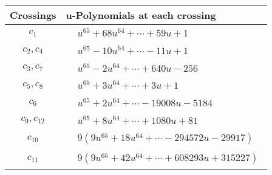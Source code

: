 \documentclass[1p]{elsarticle_modified}
\theoremstyle{definition}
\begin{document}
\begin{tabular}{m{50pt}|m{274pt}}
Crossings & \hspace{64pt}u-Polynomials at each crossing \\
\hline $$\begin{aligned}c_{1}\end{aligned}$$&$\begin{aligned}
&u^{65}+68 u^{64}+\cdots+59 u+1
\end{aligned}$\\
\hline $$\begin{aligned}c_{2},c_{4}\end{aligned}$$&$\begin{aligned}
&u^{65}-10 u^{64}+\cdots-11 u+1
\end{aligned}$\\
\hline $$\begin{aligned}c_{3},c_{7}\end{aligned}$$&$\begin{aligned}
&u^{65}-2 u^{64}+\cdots+640 u-256
\end{aligned}$\\
\hline $$\begin{aligned}c_{5},c_{8}\end{aligned}$$&$\begin{aligned}
&u^{65}+3 u^{64}+\cdots+3 u+1
\end{aligned}$\\
\hline $$\begin{aligned}c_{6}\end{aligned}$$&$\begin{aligned}
&u^{65}+2 u^{64}+\cdots-19008 u-5184
\end{aligned}$\\
\hline $$\begin{aligned}c_{9},c_{12}\end{aligned}$$&$\begin{aligned}
&u^{65}+8 u^{64}+\cdots+1080 u+81
\end{aligned}$\\
\hline $$\begin{aligned}c_{10}\end{aligned}$$&$\begin{aligned}
&9(9 u^{65}+18 u^{64}+\cdots-294572 u-29917)
\end{aligned}$\\
\hline $$\begin{aligned}c_{11}\end{aligned}$$&$\begin{aligned}
&9(9 u^{65}+42 u^{64}+\cdots+608293 u+315227)
\end{aligned}$\\
\hline
\end{tabular}\\~\\
\end{document}
